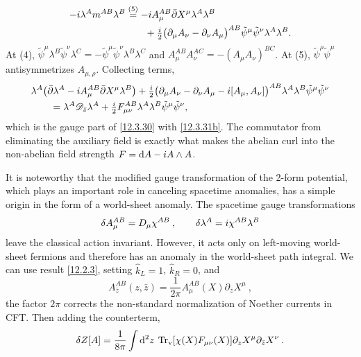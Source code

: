 \begin{tcolorbox}[breakable]
\begin{remark}
\begin{align*}
			-i\lambda^{A}m^{AB}\lambda^{B}
			&\overset{(5)}{=} -i A^{AB}_{\mu}\bar\partial X^{\mu}\lambda^{A}\lambda^{B}\\
			&\qquad+\tfrac{i}{2}\bigl(\partial_{\mu}A_{\nu}-\partial_{\nu}A_{\mu}\bigr)^{AB}\tilde\psi^{\mu}\tilde\psi^{\nu}\lambda^{A}\lambda^{B} .
		\end{align*}
		At (4), $\tilde\psi^{\mu}\lambda^{B}\tilde\psi^{\nu}\lambda^{C}=-\tilde\psi^{\mu}\tilde\psi^{\nu}\lambda^{B}\lambda^{C}$ and $A^{AB}_{\mu}A^{AC}_{\nu}=-(A_{\mu}A_{\nu})^{BC}$. At (5), $\tilde\psi^{\rho}\tilde\psi^{\mu}$ antisymmetrizes $A_{\mu,\rho}$. Collecting terms,
		\begin{align*}
		&\lambda^{A}\bigl(\bar\partial\lambda^{A}-i A^{AB}_{\mu}\bar\partial X^{\mu}\lambda^{B}\bigr)
		+\tfrac{i}{2}\bigl(\partial_{\mu}A_{\nu}-\partial_{\nu}A_{\mu}-i[A_{\mu},A_{\nu}]\bigr)^{AB}\lambda^{A}\lambda^{B}\tilde\psi^{\mu}\tilde\psi^{\nu}\\
		&\qquad=\lambda^{A}\mathscr D_{\bar z}\lambda^{A}+\tfrac{i}{2}F^{AB}_{\mu\nu}\lambda^{A}\lambda^{B}\tilde\psi^{\mu}\tilde\psi^{\nu},
		\end{align*}
		which is the gauge part of \eqref{12.3.30} with \eqref{12.3.31b}. The commutator from eliminating the auxiliary field is exactly what makes the abelian curl into the non-abelian field strength $F=\mathrm{d} A-i A\wedge A$.
	\end{remark}
\end{tcolorbox}
It is noteworthy that the modified gauge transformation of the 2-form potential, which plays an important role in canceling spacetime anomalies, has a simple origin in the form of a world-sheet anomaly.
The spacetime gauge transformations
\begin{equation}
	\delta A_{\mu}^{AB}= D_{\mu}\chi^{AB} \:, \qquad \delta\lambda^{A} = i \chi^{AB}\lambda^{B} \label{12.3.32}
\end{equation}
leave the classical action invariant. However, it acts only on left-moving world-sheet fermions and therefore has an anomaly in the world-sheet path integral. We can use result \eqref{12.2.3}, setting $\hat{k}_{L}=1$, $\hat{k}_{R}=0$, and
\begin{equation}
	A_{\bar{z}}^{AB}(z,\bar{z})=\frac{1}{2\pi}A_{\mu}^{AB}(X)\partial_{\bar{z}}X^{\mu} \:, \label{12.3.33}
\end{equation}
the factor $2\pi$ corrects the non-standard normalization of Noether currents in CFT. Then adding the counterterm,
\begin{equation}
	\delta Z[A] = \frac{1}{8\pi}\int \mathrm{d}^{2}z\: \operatorname{Tr}_{\mathrm{v}}[\chi(X)F_{\mu\nu}(X)]\partial_{z}X^{\mu}\partial_{\bar{z}}X^{\nu} \:. \label{12.3.34}
\end{equation}
